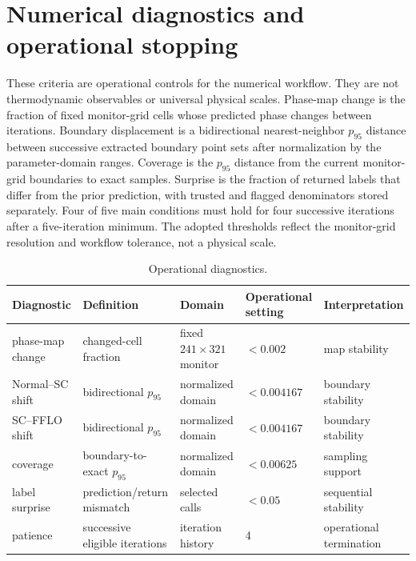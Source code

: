 \section{Numerical diagnostics and operational stopping}
These criteria are operational controls for the numerical workflow. They are not thermodynamic observables or universal physical scales. Phase-map change is the fraction of fixed monitor-grid cells whose predicted phase changes between iterations. Boundary displacement is a bidirectional nearest-neighbor $p_{95}$ distance between successive extracted boundary point sets after normalization by the parameter-domain ranges. Coverage is the $p_{95}$ distance from the current monitor-grid boundaries to exact samples. Surprise is the fraction of returned labels that differ from the prior prediction, with trusted and flagged denominators stored separately. Four of five main conditions must hold for four successive iterations after a five-iteration minimum. The adopted thresholds reflect the monitor-grid resolution and workflow tolerance, not a physical scale.
\begin{table}[t]\caption{Operational diagnostics.}\centering\setlength{\tabcolsep}{5pt}\begin{tabular}{p{}p{}p{}p{}p{}}\toprule Diagnostic&Definition&Domain&Operational setting&Interpretation\\\midrule phase-map change&changed-cell fraction&fixed $241\times321$ monitor&$<0.002$&map stability\\ Normal--SC shift&bidirectional $p_{95}$&normalized domain&$<0.004167$&boundary stability\\ SC--FFLO shift&bidirectional $p_{95}$&normalized domain&$<0.004167$&boundary stability\\ coverage&boundary-to-exact $p_{95}$&normalized domain&$<0.00625$&sampling support\\ label surprise&prediction/return mismatch&selected calls&$<0.05$&sequential stability\\ patience&successive eligible iterations&iteration history&4&operational termination\\\bottomrule\end{tabular}\end{table}

